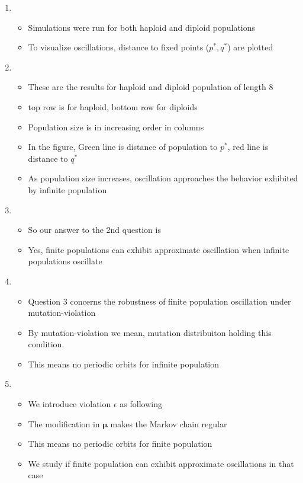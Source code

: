 \documentclass{article}
\begin{document}
\begin{enumerate}
\item
  \begin{itemize}
  \item Simulations were run for both haploid and diploid populations
  \item To visualize oscillations, distance to fixed points ($p^\ast , q^\ast$) are plotted
  \end{itemize}
    
\item
  \begin{itemize}
  \item These are the results for haploid and diploid population of
    length 8
   \item top row is for haploid, bottom row for diploids
  \item Population size is in increasing order in columns
  \item In the figure, Green line is distance of population to $p^\ast$, red line is distance to $q^\ast$
  \item As population size increases, oscillation approaches the
    behavior exhibited by infinite population
  \end{itemize}
    
    
\item
  \begin{itemize}
  \item So our answer to the 2nd question is
   \item Yes, finite populations can exhibit approximate oscillation when infinite populations oscillate
  \end{itemize}
  
\item
  \begin{itemize}
  \item Question 3 concerns the robustness of finite population oscillation under mutation-violation
  \item By mutation-violation we mean, mutation distribuiton holding this condition.
  \item This means no periodic orbits for infinite population
  \end{itemize}

\item
  \begin{itemize}
  \item We introduce violation $\epsilon$ as following
  \item The modification in $\bm{\mu}$ makes the Markov chain regular 
  \item This means no periodic orbits for finite population  
  \item We study if finite population can exhibit approximate oscillations in that case 
  \end{itemize}
  

\end{enumerate}
\end{document}
